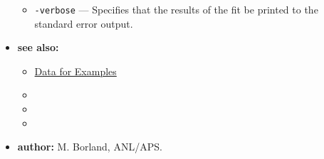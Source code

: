 \begin{itemize}
\begin{itemize}
    \item {\tt -verbose} --- Specifies that the results of the fit be printed to the standard error output.
    \end{itemize}
\item {\bf see also:}
    \begin{itemize}
    \item \hyperref[exampleData]{Data for Examples}
    \item {}
    \item {}
    \item {}
    \end{itemize}
\item {\bf author:} M. Borland, ANL/APS.
\end{itemize}

